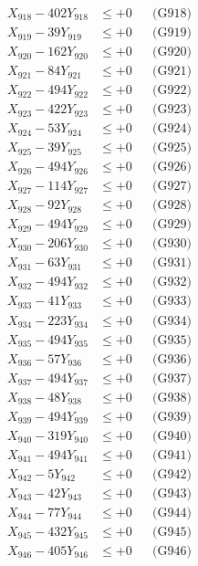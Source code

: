 \documentclass[a4paper,10pt]{article}
\begin{document}
{\begin{align}
X_{918} - 402Y_{918} &\leq +0 && \text{(G918)} \\
X_{919} - 39Y_{919} &\leq +0 && \text{(G919)} \\
X_{920} - 162Y_{920} &\leq +0 && \text{(G920)} \\
\allowbreak
X_{921} - 84Y_{921} &\leq +0 && \text{(G921)} \\
X_{922} - 494Y_{922} &\leq +0 && \text{(G922)} \\
X_{923} - 422Y_{923} &\leq +0 && \text{(G923)} \\
X_{924} - 53Y_{924} &\leq +0 && \text{(G924)} \\
X_{925} - 39Y_{925} &\leq +0 && \text{(G925)} \\
X_{926} - 494Y_{926} &\leq +0 && \text{(G926)} \\
X_{927} - 114Y_{927} &\leq +0 && \text{(G927)} \\
X_{928} - 92Y_{928} &\leq +0 && \text{(G928)} \\
X_{929} - 494Y_{929} &\leq +0 && \text{(G929)} \\
X_{930} - 206Y_{930} &\leq +0 && \text{(G930)} \\
\allowbreak
X_{931} - 63Y_{931} &\leq +0 && \text{(G931)} \\
X_{932} - 494Y_{932} &\leq +0 && \text{(G932)} \\
X_{933} - 41Y_{933} &\leq +0 && \text{(G933)} \\
X_{934} - 223Y_{934} &\leq +0 && \text{(G934)} \\
X_{935} - 494Y_{935} &\leq +0 && \text{(G935)} \\
X_{936} - 57Y_{936} &\leq +0 && \text{(G936)} \\
X_{937} - 494Y_{937} &\leq +0 && \text{(G937)} \\
X_{938} - 48Y_{938} &\leq +0 && \text{(G938)} \\
X_{939} - 494Y_{939} &\leq +0 && \text{(G939)} \\
X_{940} - 319Y_{940} &\leq +0 && \text{(G940)} \\
\allowbreak
X_{941} - 494Y_{941} &\leq +0 && \text{(G941)} \\
X_{942} - 5Y_{942} &\leq +0 && \text{(G942)} \\
X_{943} - 42Y_{943} &\leq +0 && \text{(G943)} \\
X_{944} - 77Y_{944} &\leq +0 && \text{(G944)} \\
X_{945} - 432Y_{945} &\leq +0 && \text{(G945)} \\
X_{946} - 405Y_{946} &\leq +0 && \text{(G946)} \\

\end{align}}
\end{document}
